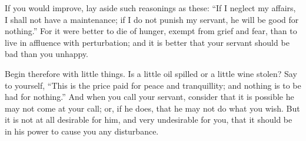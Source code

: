 If you  would improve, lay  aside such reasonings as  these: ``If I  neglect my
affairs, I shall not have a maintenance; if I do not punish my servant, he will
be good for nothing.''  For it were better to die of  hunger, exempt from grief
and fear, than  to live in affluence  with perturbation; and it  is better that
your servant should be bad than you unhappy.

Begin therefore with  little things. Is a  little oil spilled or  a little wine
stolen? Say to  yourself, ``This is the price paid  for peace and tranquillity;
and  nothing is  to be  had  for nothing.''  And  when you  call your  servant,
consider that it is possible he may not come at your call; or, if he does, that
he may not do what  you wish. But it is not at all  desirable for him, and very
undesirable  for  you,  that it  should  be  in  his  power to  cause  you  any
disturbance.
